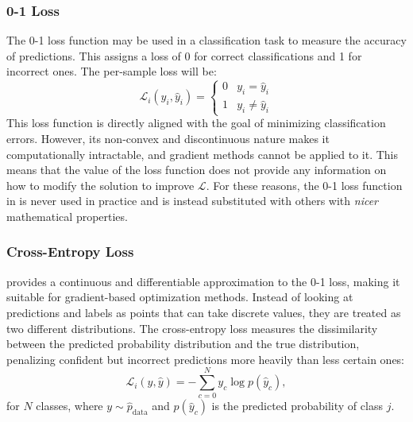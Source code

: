 
\subsubsection{0-1 Loss} The 0-1 loss function may be used in a classification task to measure the accuracy of predictions. This assigns a loss of 0 for correct classifications and 1 for incorrect ones. The per-sample loss will be:
\begin{equation}
    \mathcal{L}_i(y_i,\hat{y}_i)=     \begin{cases}
      0 & y_i = \hat{y}_i\\
      1 & y_i \neq \hat{y}_i
    \end{cases}
    \label{eq:01loss}
\end{equation} 
This loss function is directly aligned with the goal of minimizing classification errors. However, its non-convex and discontinuous nature makes it computationally intractable, and gradient methods cannot be applied to it. This means that the value of the loss function does not provide any information on how to modify the solution to improve $\mathcal{L}$. For these reasons, the 0-1 loss function in  is never used in practice and is instead substituted with others with \textit{nicer} mathematical properties.

\subsubsection{Cross-Entropy Loss} provides a continuous and differentiable approximation to the 0-1 loss, making it suitable for gradient-based optimization methods. Instead of looking at predictions and labels as points that can take discrete values, they are treated as two different distributions. The cross-entropy loss measures the dissimilarity between the predicted probability distribution and the true distribution, penalizing confident but incorrect predictions more heavily than less certain ones:
\begin{equation}
    \mathcal{L}_i(y,\hat{y})= -\sum_{c=0}^N y_c\log p(\hat{y}_c),
    \label{eq:celoss}
\end{equation}
for $N$ classes, where $y \sim \hat{p}_\text{data}$ and $p(\hat{y}_c)$ is the predicted probability of class $j$.

